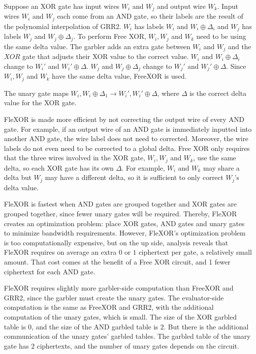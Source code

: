 Suppose an XOR gate has input wires $W_i$ and $W_j$ and output wire $W_k$.
Input wires $W_i$ and $W_j$ each come from an AND gate, so their labels are the result of the polynomial interpolation of GRR2.
$W_i$ has labels $W_i$ and $W_i \oplus \Delta_i$ and $W_j$ has labels $W_j$ and $W_j \oplus \Delta_j$.
To perform Free XOR, $W_i,W_j$ and $W_k$ need to be using the same delta value. 
The garbler adds an extra gate between $W_i$ and $W_j$ and the $XOR$ gate that adjusts their XOR value to the correct value.
$W_i$ and $W_i \oplus \Delta_i$ change to $W_i'$ and $W_i' \oplus \Delta$.
$W_j$ and $W_j \oplus \Delta_j$ change to $W_j'$ and $W_j' \oplus \Delta$.
Since $W_i, W_j$ and $W_k$ have the same delta value, FreeXOR is used.

The unary gate maps $W_i,W_i \oplus \Delta_1 \to W_i', W_i' \oplus \Delta$, where $\Delta$ is the correct delta value for the XOR gate.

FleXOR is made more efficient by not correcting the output wire of every AND gate.
For example, if an output wire of an AND gate is immediately inputted into another AND gate, the wire label does not need to corrected.
Moreover, the wire labels do not even need to be corrected to a global delta.
Free XOR only requires that the three wires involved in the XOR gate, $W_i, W_j$ and $W_k$, use the same delta, so each XOR gate has its own $\Delta$.
For example, $W_i$ and $W_k$ may share a delta but $W_j$ may have a different delta, so it is sufficient to only correct $W_j$'s delta value.

FleXOR is fastest when AND gates are grouped together and XOR gates are grouped together, since fewer unary gates will be required.
Thereby, FleXOR creates an optimization problem: place XOR gates, AND gates and unary gates to minimize bandwidth requirements.
However, FleXOR's optimization problem is too computationally expensive, but on the up side, analysis reveals that FleXOR requires on average an extra $0$ or $1$ ciphertext per gate, a relatively small amount.
That cost comes at the benefit of a Free XOR circuit, and 1 fewer ciphertext for each AND gate.

FleXOR requires slightly more garbler-side computation than FreeXOR and GRR2, since the garbler must create the unary gates.
The evaluator-side computation is the same as FreeXOR and GRR2, with the additional computation of the unary gates, which is small.
The size of the XOR garbled table is $0$, and the size of the AND garbled table is $2$.
But there is the additional communication of the unary gates' garbled tables.
The garbled table of the unary gate has $2$ ciphertexts, and the number of unary gates depends on the circuit.

